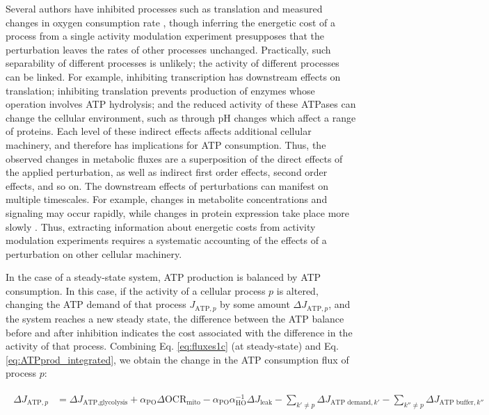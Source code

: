 \documentclass{compactarticle}
\begin{document}
Several authors have inhibited processes such as translation and measured changes in oxygen consumption rate \cite{wieser2001hierarchies,smith1995protein}, though inferring the energetic cost of a process from a single activity modulation experiment presupposes that the perturbation leaves the rates of other processes unchanged. Practically, such separability of different processes is unlikely; the activity of different processes can be linked. For example, inhibiting transcription has downstream effects on translation; inhibiting translation prevents production of enzymes whose operation involves ATP hydrolysis; and the reduced activity of these ATPases can change the cellular environment, such as through pH changes which affect a range of proteins. Each level of these indirect effects affects additional cellular machinery, and therefore has implications for ATP consumption. Thus, the observed changes in metabolic fluxes are a superposition of the direct effects of the applied perturbation, as well as indirect first order effects, second order effects, and so on. The downstream effects of perturbations can manifest on multiple timescales. For example, changes in metabolite concentrations and signaling may occur rapidly, while changes in protein expression take place more slowly \cite{buchenberg_time-resolved_2017,maier_quantification_2011,Kresnowati_when_2006}. Thus, extracting information about energetic costs from activity modulation experiments requires a systematic accounting of the effects of a perturbation on other cellular machinery.

In the case of a steady-state system, ATP production is balanced by ATP consumption. In this case, if the activity of a cellular process $p$ is altered, changing the ATP demand of that process $J_{\text{ATP},p}$ by some amount $ \Delta J_{\text{ATP},p}$, and the system reaches a new steady state, the difference between the ATP balance before and after inhibition indicates the cost associated with the difference in the activity of that process. Combining Eq. \ref{eq:fluxes1c} (at steady-state) and Eq. \ref{eq:ATPprod_integrated}, we obtain the change in the ATP consumption flux of process $p$:

\begin{align}
    \begin{split}
        \Delta J_{\text{ATP},p} &= \Delta J_\text{ATP,glycolysis} + \alpha_\text{PO} \Delta \text{OCR}_\text{mito} - \alpha_\text{PO} \alpha_\text{HO}^{-1} \Delta J_\text{leak} - \sum_{k' \neq p} \Delta J_{\text{ATP demand},k'} - \sum_{k'' \neq p} \Delta J_{\text{ATP buffer},k''}
    \end{split}
    \label{eq:ATPcost_inhibitionexpt}
\end{align}
\end{document}

